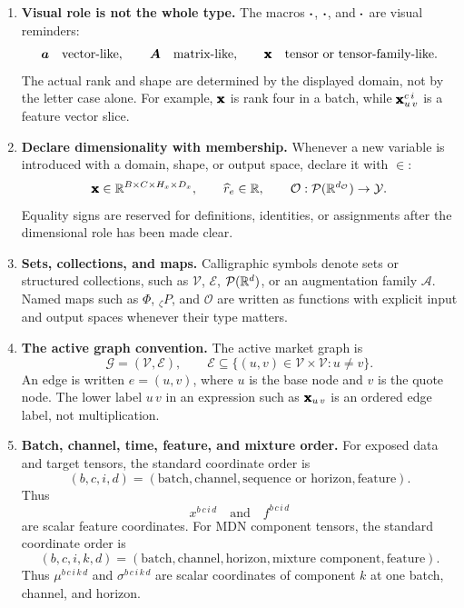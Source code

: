 \begin{enumerate}
  \item \textbf{Visual role is not the whole type.}
  The macros $\bm{\cdot}$, $\bm{\cdot}$, and $\pmb{\mathbf{\cdot}}$ are visual
  reminders:
  \[
    \bm{a}\quad\text{vector-like},\qquad
    \bm{A}\quad\text{matrix-like},\qquad
    \pmb{\mathbf{x}}\quad\text{tensor or tensor-family-like}.
  \]
  The actual rank and shape are determined by the displayed domain, not by the
  letter case alone.  For example, $\pmb{\mathbf{x}}$ is rank four in a batch, while
  $\pmb{\mathbf{x}}_{u\,v}^{c\,i}$ is a feature vector slice.

  \item \textbf{Declare dimensionality with membership.}
  Whenever a new variable is introduced with a domain, shape, or output space,
  declare it with $\in$:
  \[
    \pmb{\mathbf{x}}\in\mathbb{R}^{B\times C\times H_x\times D_x},
    \qquad
    \widehat{r}_e\in\mathbb{R},
    \qquad
    \mathcal{O}:\mathcal{P}(\mathbb{R}^{d_{\mathcal{O}}})\rightarrow\mathcal{Y}.
  \]
  Equality signs are reserved for definitions, identities, or assignments after
  the dimensional role has been made clear.

  \item \textbf{Sets, collections, and maps.}
  Calligraphic symbols denote sets or structured collections, such as
  $\mathcal{V}$, $\mathcal{E}$, $\mathcal{P}(\mathbb{R}^d)$, or an augmentation family
  $\mathcal{A}$.  Named maps such as $\Phi$, ${}_{\zeta}P$, and
  $\mathcal{O}$ are written as functions with explicit input and output spaces
  whenever their type matters.

  \item \textbf{The active graph convention.}
  The active market graph is
  \[
    \mathcal{G}=(\mathcal{V},\mathcal{E}),
    \qquad
    \mathcal{E}
    \subseteq
    \{(u,v)\in\mathcal{V}\times\mathcal{V}:u\ne v\}.
  \]
  An edge is written $e=(u,v)$, where $u$ is the base node and $v$ is the quote
  node.  The lower label $u\,v$ in an expression such as
  $\pmb{\mathbf{x}}_{u\,v}$ is an ordered edge label, not multiplication.

  \item \textbf{Batch, channel, time, feature, and mixture order.}
  For exposed data and target tensors, the standard coordinate order is
  \[
    (b,c,i,d)
    =
    (\text{batch},\text{channel},\text{sequence or horizon},\text{feature}).
  \]
  Thus
  \[
    x^{b\,c\,i\,d}
    \quad\text{and}\quad
    f^{b\,c\,i\,d}
  \]
  are scalar feature coordinates.  For MDN component tensors, the standard
  coordinate order is
  \[
    (b,c,i,k,d)
    =
    (\text{batch},\text{channel},\text{horizon},\text{mixture component},
    \text{feature}).
  \]
  Thus $\mu^{b\,c\,i\,k\,d}$ and $\sigma^{b\,c\,i\,k\,d}$ are scalar
  coordinates of component $k$ at one batch, channel, and horizon.


\end{enumerate}
